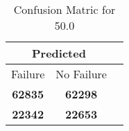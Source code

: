 \begin{table}[] 
\caption{Confusion Matric for 50.0} 
\label{Table: Prediction Accuracy-DMD50.0OnlySunEKF-resetReflection-Reflection} 
\centering 
\begin{tabular} 
 {@{}ccc@{}} 
\toprule 
\multicolumn{2}{c}{\textbf{Predicted}}
 \\ \midrule 
\multicolumn{1}{|c|}{Failure} & 
\multicolumn{1}{c|}{No Failure}
 \\ \midrule 
\multicolumn{1}{|c|}{\color{green}\textbf{62835}} & 
\multicolumn{1}{c|}{\color{green}\textbf{62298}}
 \\ \midrule 
\multicolumn{1}{|c|}{\color{red}\textbf{22342}} & 
\multicolumn{1}{c|}{\color{red}\textbf{22653}}
 \\ \bottomrule 
\end{tabular} 
\end{table} 
